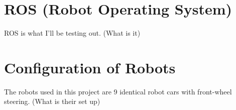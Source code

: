 \documentclass[../dissertation.tex]{subfiles}
\begin{document}
\section{ROS (Robot Operating System)}

ROS is what I'll be testing out. (What is it)

\section{Configuration of Robots}

The robots used in this project are 9 identical robot cars with front-wheel steering. (What is their set up)
\end{document}
